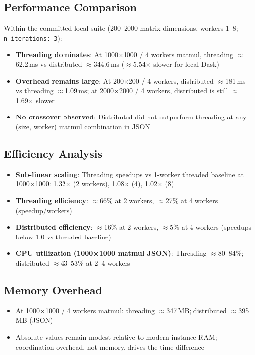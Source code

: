 \subsection{Performance Comparison}

Within the committed local suite (200--2000 matrix dimensions, workers 1--8; \texttt{n\_iterations: 3}):

\begin{itemize}
    \item \textbf{Threading dominates}: At 1000×1000 / 4 workers matmul, threading $\approx$62.2\,ms vs distributed $\approx$344.6\,ms ($\approx$5.54× slower for local Dask)
    \item \textbf{Overhead remains large}: At 200×200 / 4 workers, distributed $\approx$181\,ms vs threading $\approx$1.09\,ms; at 2000×2000 / 4 workers, distributed is still $\approx$1.69× slower
    \item \textbf{No crossover observed}: Distributed did not outperform threading at any (size, worker) matmul combination in JSON
\end{itemize}

\subsection{Efficiency Analysis}

\begin{itemize}
    \item \textbf{Sub-linear scaling}: Threading speedups vs 1-worker threaded baseline at 1000×1000: 1.32× (2 workers), 1.08× (4), 1.02× (8)
    \item \textbf{Threading efficiency}: $\approx$66\% at 2 workers, $\approx$27\% at 4 workers (speedup/workers)
    \item \textbf{Distributed efficiency}: $\approx$16\% at 2 workers, $\approx$5\% at 4 workers (speedups below 1.0 vs threaded baseline)
    \item \textbf{CPU utilization (1000×1000 matmul JSON)}: Threading $\approx$80--84\%; distributed $\approx$43--53\% at 2--4 workers
\end{itemize}

\subsection{Memory Overhead}

\begin{itemize}
    \item At 1000×1000 / 4 workers matmul: threading $\approx$347\,MB; distributed $\approx$395\,MB (JSON)
    \item Absolute values remain modest relative to modern instance RAM; coordination overhead, not memory, drives the time difference
\end{itemize}

